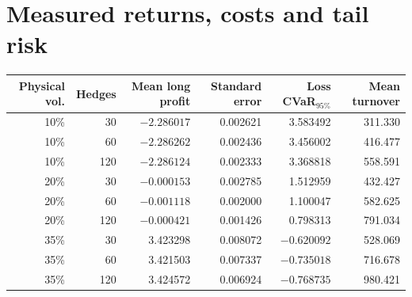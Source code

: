 \documentclass[8pt]{strategynet-journal}
\begin{document}
\noindent\begin{minipage}{\linewidth}
\section{Measured returns, costs and tail risk}
\begin{center}
\begin{tabular}{@{}rrrrrr@{}}
\toprule
Physical vol. & Hedges & Mean long profit & Standard error & Loss CVaR$_{95\%}$ & Mean turnover\\
\midrule
10\%&30&$-2.286017$&0.002621&3.583492&311.330\\
10\%&60&$-2.286262$&0.002436&3.456002&416.477\\
10\%&120&$-2.286124$&0.002333&3.368818&558.591\\
20\%&30&$-0.000153$&0.002785&1.512959&432.427\\
20\%&60&$-0.001118$&0.002000&1.100047&582.625\\
20\%&120&$-0.000421$&0.001426&0.798313&791.034\\
35\%&30&3.423298&0.008072&$-0.620092$&528.069\\
35\%&60&3.421503&0.007337&$-0.735018$&716.678\\
35\%&120&3.424572&0.006924&$-0.768735$&980.421\\
\bottomrule
\end{tabular}
\end{center}
\end{minipage}
\end{document}
